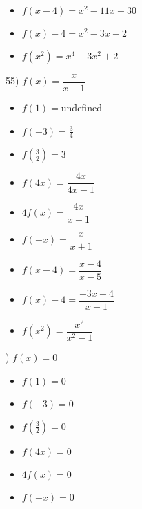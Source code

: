 \documentclass[11pt]{book}
\theoremstyle{definition}  %
\begin{document}
\begin{multicols}{3}
\begin{itemize}
\item  $f(x-4)=x^2-11x+30$
\item $f(x) - 4=x^2-3x-2$
\item  $f\left(x^2\right)=x^4-3x^2+2$
\end{itemize}
\end{multicols}
\normalsize

55) $f(x)=\dfrac{x}{x-1}$
\scriptsize
\begin{multicols}{3}
\begin{itemize}
\item $f(1)=$undefined
\item $f(-3)=\frac{3}{4}$
\item $f\left(\frac{3}{2} \right)=3$
\end{itemize}
\end{multicols}

\begin{multicols}{3}
\begin{itemize}
\item  $f(4x)=\dfrac{4x}{4x-1}$
\item $4f(x)=\dfrac{4x}{x-1}$
\item $f(-x)=\dfrac{x}{x+1}$
\end{itemize}
\end{multicols}

\begin{multicols}{3}
\begin{itemize}
\item  $f(x-4)=\dfrac{x-4}{x-5}$
\item $f(x) - 4=\dfrac{-3x+4}{x-1}$
\item  $f\left(x^2\right)=\dfrac{x^2}{x^2-1}$
\end{itemize}
\end{multicols}
\normalsize

) $f(x)=0$
\scriptsize
\begin{multicols}{3}
\begin{itemize}
\item $f(1)=0$
\item $f(-3)=0$
\item $f\left(\frac{3}{2} \right)=0$
\end{itemize}
\end{multicols}

\begin{multicols}{3}
\begin{itemize}
\item  $f(4x)=0$
\item $4f(x)=0$
\item $f(-x)=0$
\end{itemize}
\end{multicols}
\end{document}
